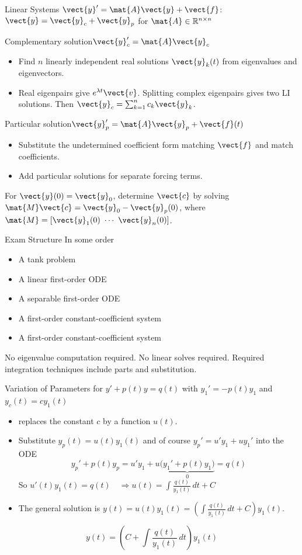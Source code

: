 \documentclass[11pt,aspectratio=169]{beamer}
\begin{document}
\begin{frame}{Linear Systems $\vect{y}'=\mat{A}\vect{y}+\vect{f}$: \quad $\vect{y}=\vect{y}_c+\vect{y}_p$
		for $\mat{A}\in\mathbb{R}^{n\times n}$}
\begin{block}{Complementary solution\quad $\vect{y}_c'=\mat{A}\vect{y}_c$}
\begin{itemize}
  \item Find $n$ linearly independent real solutions $\vect{y}_k(t)$ from eigenvalues and eigenvectors.
  \item Real eigenpairs give $e^{\lambda t}\vect{v}$. Splitting complex eigenpairs gives two LI solutions.
  Then $\vect{y}_c=\sum_{k=1}^{n}c_k\vect{y}_k$.
\end{itemize}
\end{block}
\begin{block}{Particular solution\quad $\vect{y}_p'=\mat{A}\vect{y}_p+\vect{f}(t)$}
\begin{itemize}
  \item Substitute the undetermined coefficient 
  form matching $\vect{f}$ and match coefficients.
  \item Add particular solutions for separate forcing terms.
\end{itemize}
\end{block}
For $\vect{y}(0)=\vect{y}_0$, determine $\vect{c}$ by solving
$\mat{M}\vect{c}=\vect{y}_0-\vect{y}_p(0)$,
where $\mat{M}=[\vect{y}_1(0)\ \cdots\ \vect{y}_n(0)]$.
\end{frame}
\begin{frame}{Exam Structure}
In some order
\begin{itemize}
  \item A tank problem
  \item A linear first-order ODE
  \item A separable first-order ODE
  \item A first-order constant-coefficient system
  \item A first-order constant-coefficient system
\end{itemize}
\vfill
No eigenvalue computation required. No linear solves required.
Required integration techniques include parts and substitution.
\end{frame}
\begin{frame}{Variation of Parameters for $y'+p(t)y=q(t)$ with $y_1'=-p(t)y_1$
	and $y_c(t)=c y_1(t)$}
\begin{itemize}
  \item {} replaces the constant $c$ by a function $u(t)$.
  \item Substitute $y_p(t)=u(t)y_1(t)$ and of course  
  $y_p'=u'y_1+uy_1'$ into the ODE
  \[
    y_p'+p(t)y_p
    =u'y_1+u\underbrace{\bigl(y_1'+p(t)y_1\bigr)}_{0}=q(t)
  \]
  So $ u'(t)y_1(t)=q(t)
    \quad
    \Longrightarrow
    u(t)=\int\frac{q(t)}{y_1(t)}\,dt + C
    $
 \item The general solution is
$y(t)=u(t)y_1(t)=\left(\int\frac{q(t)}{y_1(t)}\,dt+C\right)y_1(t)$.
\end{itemize}
\vfill
\[
  \boxed{y(t)=\left(C+\int\frac{q(t)}{y_1(t)}\,dt\right)y_1(t)}
\]
\end{frame}
\end{document}

